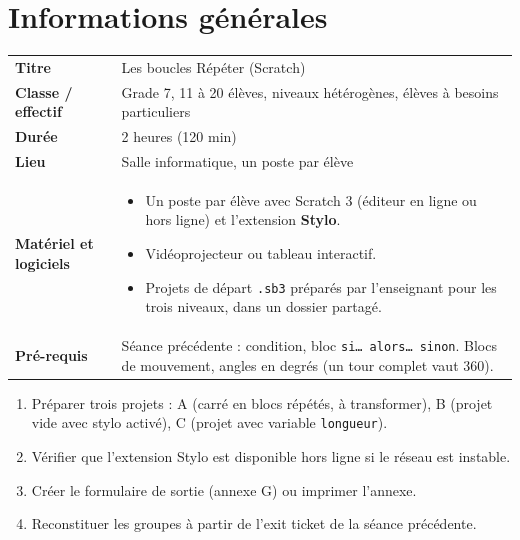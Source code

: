\documentclass[11pt,a4paper]{article}
\begin{document}

\section{Informations générales}
\begin{tabularx}{\linewidth}{>{\bfseries}p{3.6cm}Y}
\toprule
Titre & Les boucles Répéter (Scratch)\\
Classe / effectif & Grade 7, 11 à 20 élèves, niveaux hétérogènes, élèves à besoins particuliers\\
Durée & 2 heures (120 min)\\
Lieu & Salle informatique, un poste par élève\\
Matériel et logiciels &
\begin{itemize}
 \item Un poste par élève avec Scratch 3 (éditeur en ligne ou hors ligne) et l'extension \textbf{Stylo}.
 \item Vidéoprojecteur ou tableau interactif.
 \item Projets de départ \texttt{.sb3} préparés par l'enseignant pour les trois niveaux, dans un dossier partagé.
\end{itemize}\\
Pré-requis &
Séance précédente : condition, bloc \texttt{si\ldots{} alors\ldots{} sinon}. Blocs de mouvement, angles en degrés (un tour complet vaut 360).\\
\bottomrule
\end{tabularx}

\begin{astuce}
\begin{enumerate}
 \item Préparer trois projets : A (carré en blocs répétés, à transformer), B (projet vide avec stylo activé), C (projet avec variable \texttt{longueur}).
 \item Vérifier que l'extension Stylo est disponible hors ligne si le réseau est instable.
 \item Créer le formulaire de sortie (annexe G) ou imprimer l'annexe.
 \item Reconstituer les groupes à partir de l'exit ticket de la séance précédente.
\end{enumerate}
\end{astuce}

\end{document}
